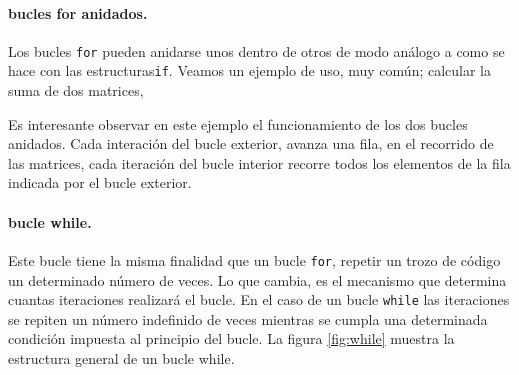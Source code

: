 \paragraph{bucles for anidados.} Los bucles \texttt{for} pueden anidarse unos dentro de otros de modo análogo a como se hace con las estructuras\texttt{if}. Veamos un ejemplo de uso, muy común; calcular la suma de dos matrices,



Es interesante observar en este ejemplo el funcionamiento de los dos bucles anidados. Cada interación del bucle exterior, avanza una fila, en el recorrido de las matrices, cada iteración del bucle interior recorre todos los elementos de la fila indicada por el bucle exterior.

\paragraph{bucle while.}  Este bucle tiene la misma finalidad que un bucle \texttt{for}, repetir un trozo de código un determinado número de veces. Lo que cambia, es el mecanismo que determina cuantas iteraciones realizará el bucle. En el caso de un bucle \texttt{while} las iteraciones se repiten un número indefinido de veces mientras se cumpla una determinada condición impuesta al principio del bucle. La figura \ref{fig:while} muestra la estructura general de un bucle while.

